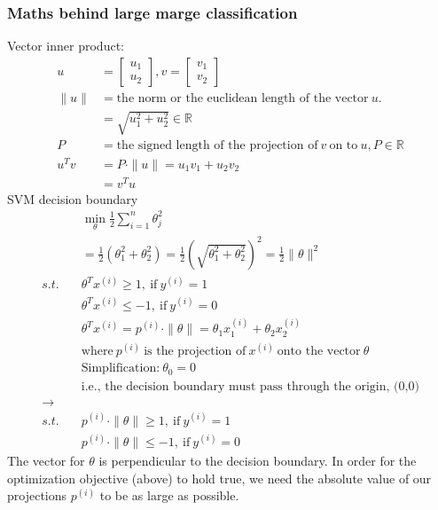 \subsubsection{Maths behind large marge classification}
Vector inner product:
\begin{align*}
u &= \begin{bmatrix} u_1 \\ u_2 \end{bmatrix}, v = \begin{bmatrix} v_1 \\ v_2 \end{bmatrix}\\
\|u\| &= \text{the norm or the euclidean length of the vector} ~ u.\\
&=\sqrt{u_1^2 + u_2^2} \in \mathbb{R}\\
P &= \text{the signed length of the projection of} ~ v ~ \text{on to} ~ u, P \in \mathbb{R}\\
u^{T}v &= P \cdot \|u\| = u_1v_1+u_2v_2\\
& = v^{T}u
\end{align*}
SVM decision boundary
\begin{align}
&\underset{\theta}{\min}\frac{1}{2}\sum_{i=1}^{n}\theta_j^2  \nonumber \\
&= \frac{1}{2}(\theta_1^2+\theta_2^2) = \frac{1}{2}\left(\sqrt{\theta_1^2+\theta_2^2}\right)^2 = \frac{1}{2}\|\theta\|^2\\
s.t. \quad &\theta^Tx^{(i)} \geq 1,~ \text{if} ~y^{(i)} = 1 \nonumber  \\
&\theta^Tx^{(i)} \leq -1, ~ \text{if} ~ y^{(i)} = 0 \nonumber \\
&\theta^Tx^{(i)} = p^{(i)} \cdot \|\theta\| = \theta_1x_1^{(i)} + \theta_2x_2^{(i)} \\
&\text{where} ~ p^{(i)} ~ \text{is the projection of} ~ x^{(i)} ~ \text{onto the vector} ~ \theta \nonumber \\
&\text{Simplification:} ~ \theta_0 = 0 \nonumber \\
&\text{i.e., the decision boundary must pass through the origin, (0,0)} \nonumber \\
\rightarrow & \nonumber \\
s.t. \quad &p^{(i)} \cdot \|\theta\| \geq 1, ~ \text{if} ~ y^{(i)} = 1 \nonumber \\
&p^{(i)} \cdot \|\theta\| \leq -1, ~ \text{if} ~y^{(i)} = 0 \nonumber
\end{align}
The vector for $\theta$ is perpendicular to the decision boundary. In order for the optimization objective (above) to hold true, we need the absolute value of our projections $p^{(i)}$ to be as large as possible.\\

